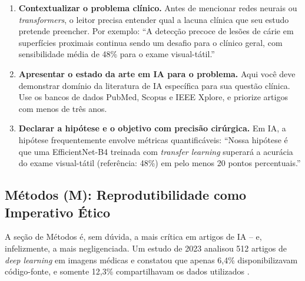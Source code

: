 \begin{enumerate}
  \item \textbf{Contextualizar o problema clínico.} Antes de mencionar redes
    neurais ou \textit{transformers}, o leitor precisa entender qual a lacuna
    clínica que seu estudo pretende preencher. Por exemplo: ``A detecção precoce
    de lesões de cárie em superfícies proximais continua sendo um desafio para o
    clínico geral, com sensibilidade média de 48\% para o exame visual-tátil.''

  \item \textbf{Apresentar o estado da arte em IA para o problema.} Aqui você
    deve demonstrar domínio da literatura de IA específica para sua questão
    clínica. Use os bancos de dados PubMed, Scopus e IEEE Xplore, e priorize
    artigos com menos de três anos.

  \item \textbf{Declarar a hipótese e o objetivo com precisão cirúrgica.} Em IA,
    a hipótese frequentemente envolve métricas quantificáveis: ``Nossa hipótese é
    que uma EfficientNet-B4 treinada com \textit{transfer learning} superará a
    acurácia do exame visual-tátil (referência: 48\%) em pelo menos 20 pontos
    percentuais.''
\end{enumerate}



\subsection{Métodos (M): Reprodutibilidade como Imperativo Ético}

A seção de Métodos é, sem dúvida, a mais crítica em artigos de IA -- e,
infelizmente, a mais negligenciada. Um estudo de 2023 analisou 512 artigos de
\textit{deep learning} em imagens médicas e constatou que apenas 6,4\%
disponibilizavam código-fonte, e somente 12,3\% compartilhavam os dados
utilizados \cite{roberts2021common}.

